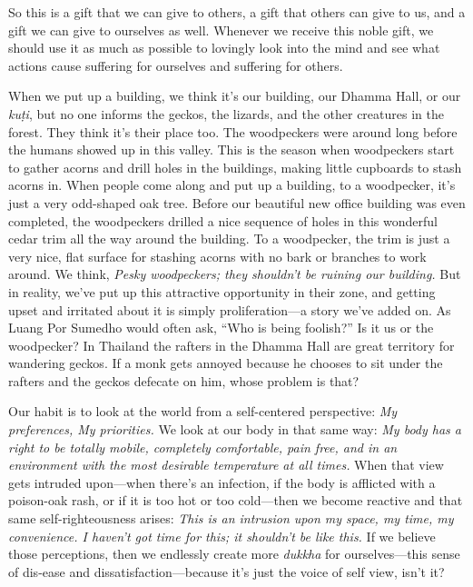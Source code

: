 So this is a gift that we can give to others, a gift that others can 
give to us, and a gift we can give to ourselves as well. Whenever we 
receive this noble gift, we should use it as much as possible to 
lovingly look into the mind and see what actions cause suffering for 
ourselves and suffering for others.


When we put up a building, we think it's our building, our Dhamma Hall, 
or our \emph{kuṭi}, but no one informs the geckos, the lizards, and 
the other creatures in the forest. They think it's their place too. The 
woodpeckers were around long before the humans showed up in this 
valley. This is the season when woodpeckers start to gather acorns and 
drill holes in the buildings, making little cupboards to stash acorns 
in. When people come along and put up a building, to a woodpecker, it's 
just a very odd-shaped oak tree. Before our beautiful new office 
building was even completed, the woodpeckers drilled a nice sequence of 
holes in this wonderful cedar trim all the way around the building. To 
a woodpecker, the trim is just a very nice, flat surface for stashing 
acorns with no bark or branches to work around. We think, \emph{Pesky 
woodpeckers; they shouldn't be ruining our building.} But in reality, 
we've put up this attractive opportunity in their zone, and getting 
upset and irritated about it is simply proliferation---a story we've 
added on. As Luang Por Sumedho would often ask, ``Who is being 
foolish?'' Is it us or the woodpecker? In Thailand the rafters in the 
Dhamma Hall are great territory for wandering geckos. If a monk gets 
annoyed because he chooses to sit under the rafters and the geckos 
defecate on him, whose problem is that?

Our habit is to look at the world from a self-centered perspective: 
\emph{My preferences, My priorities.} We look at our body in that same 
way: \emph{My body has a right to be totally mobile, completely 
comfortable, pain free, and in an environment with the most desirable 
temperature at all times.} When that view gets intruded upon---when 
there's an infection, if the body is afflicted with a poison-oak rash, 
or if it is too hot or too cold---then we become reactive and that same 
self-righteousness arises: \emph{This is an intrusion upon my space, my 
time, my convenience. I haven't got time for this; it shouldn't be like 
this.} If we believe those perceptions, then we endlessly create more 
\emph{dukkha} for ourselves---this sense of dis-ease and 
dissatisfaction---because it's just the voice of self view, isn't it?

